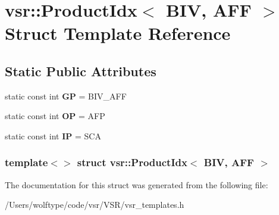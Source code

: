 \hypertarget{structvsr_1_1_product_idx_3_01_b_i_v_00_01_a_f_f_01_4}{\section{vsr\-:\-:Product\-Idx$<$ B\-I\-V, A\-F\-F $>$ Struct Template Reference}
\label{structvsr_1_1_product_idx_3_01_b_i_v_00_01_a_f_f_01_4}
}
\subsection*{Static Public Attributes}
\begin{DoxyCompactItemize}
\item 
\hypertarget{structvsr_1_1_product_idx_3_01_b_i_v_00_01_a_f_f_01_4_a3356120be5e1d09fdbd88d2a5f2b8648}{static const int {\bfseries G\-P} = B\-I\-V\-\_\-\-A\-F\-F}\label{structvsr_1_1_product_idx_3_01_b_i_v_00_01_a_f_f_01_4_a3356120be5e1d09fdbd88d2a5f2b8648}

\item 
\hypertarget{structvsr_1_1_product_idx_3_01_b_i_v_00_01_a_f_f_01_4_a94c7cc651630e25b37e5788ea6a6fc0a}{static const int {\bfseries O\-P} = A\-F\-P}\label{structvsr_1_1_product_idx_3_01_b_i_v_00_01_a_f_f_01_4_a94c7cc651630e25b37e5788ea6a6fc0a}

\item 
\hypertarget{structvsr_1_1_product_idx_3_01_b_i_v_00_01_a_f_f_01_4_a432217c702fb36917b27db6e5534559b}{static const int {\bfseries I\-P} = S\-C\-A}\label{structvsr_1_1_product_idx_3_01_b_i_v_00_01_a_f_f_01_4_a432217c702fb36917b27db6e5534559b}

\end{DoxyCompactItemize}
\subsubsection*{template$<$$>$ struct vsr\-::\-Product\-Idx$<$ B\-I\-V, A\-F\-F $>$}



The documentation for this struct was generated from the following file\-:\begin{DoxyCompactItemize}
\item 
/\-Users/wolftype/code/vsr/\-V\-S\-R/vsr\-\_\-templates.\-h\end{DoxyCompactItemize}
